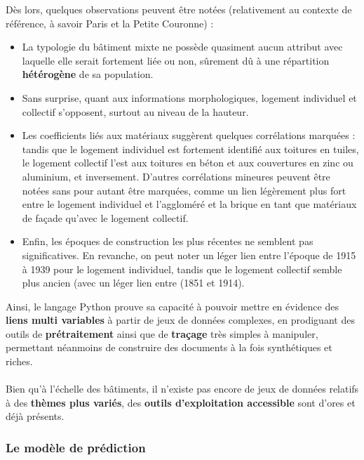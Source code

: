 \documentclass[
  11pt,
  french,
]{article}
\begin{document}
Dès lors, quelques observations peuvent être notées (relativement au
contexte de référence, à savoir Paris et la Petite Couronne) :

\begin{itemize}
\item
  La typologie du bâtiment mixte ne possède quasiment aucun attribut
  avec laquelle elle serait fortement liée ou non, sûrement dû à une
  répartition \textbf{hétérogène} de sa population.
\item
  Sans surprise, quant aux informations morphologiques, logement
  individuel et collectif s'opposent, surtout au niveau de la hauteur.
\item
  Les coefficients liés aux matériaux suggèrent quelques corrélations
  marquées : tandis que le logement individuel est fortement identifié
  aux toitures en tuiles, le logement collectif l'est aux toitures en
  béton et aux couvertures en zinc ou aluminium, et inversement.
  D'autres corrélations mineures peuvent être notées sans pour autant
  être marquées, comme un lien légèrement plus fort entre le logement
  individuel et l'aggloméré et la brique en tant que matériaux de façade
  qu'avec le logement collectif.
\item
  Enfin, les époques de construction les plus récentes ne semblent pas
  significatives. En revanche, on peut noter un léger lien entre
  l'époque de 1915 à 1939 pour le logement individuel, tandis que le
  logement collectif semble plus ancien (avec un léger lien entre (1851
  et 1914).
\end{itemize}

Ainsi, le langage Python prouve sa capacité à pouvoir mettre en évidence
des \textbf{liens multi variables} à partir de jeux de données
complexes, en prodiguant des outils de \textbf{prétraitement} ainsi que
de \textbf{traçage} très simples à manipuler, permettant néanmoins de
construire des documents à la fois synthétiques et riches.\\
~\\
Bien qu'à l'échelle des bâtiments, il n'existe pas encore de jeux de
données relatifs à des \textbf{thèmes plus variés}, des \textbf{outils
d'exploitation accessible} sont d'ores et déjà présents.

\newpage

\hypertarget{le-moduxe8le-de-pruxe9diction}{%
\subsubsection{Le modèle de
prédiction}\label{le-moduxe8le-de-pruxe9diction}}
\end{document}
